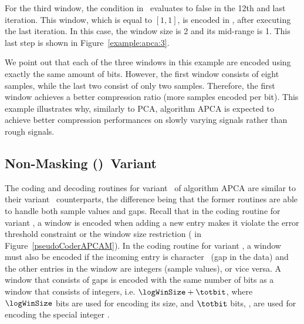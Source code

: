 For the third window, the condition in \Line \APCACodeOne\ evaluates to false in the 12th and last iteration. This window, which is equal to $[1, 1]$, is encoded in \Line \APCACodeTwo, after executing the last iteration. In this case, the window size is 2 and its mid-range is 1. This last step is shown in Figure~\ref{example:apca:3}.




We point out that each of the three windows in this example are encoded using exactly the same amount of bits. However, the first window consists of eight samples, while the last two consist of only two samples. Therefore, the first window achieves a better compression ratio (more samples encoded per bit). This example illustrates why, similarly to PCA, algorithm APCA is expected to achieve better compression performances on slowly varying signals rather than rough signals.




\clearpage
\subsection{Non-Masking (\NOmaskalgo)\ Variant}
\label{algo:apca:nmvariant}


The coding and decoding routines for variant \NOmaskalgo\ of algorithm APCA are similar to their variant \maskalgo\ counterparts, the difference being that the former routines are able to handle both sample values and gaps. Recall that in the coding routine for variant \maskalgo, a window is encoded when adding a new entry makes it violate the error threshold constraint or the window size restriction ( in Figure~\ref{pseudoCoderAPCAM}). In the coding routine for variant \NOmaskalgo, a window must also be encoded if the incoming entry is character \noData\ (gap in the data) and the other entries in the window are integers (sample values), or vice versa. A window that consists of gaps is encoded with the same number of bits as a window that consists of integers, i.e. $\logWinSize+\totbit$, where $\logWinSize$ bits are used for encoding its size, and $\totbit$ bits, \wheretotbit, are used for encoding the special integer \nodata.

